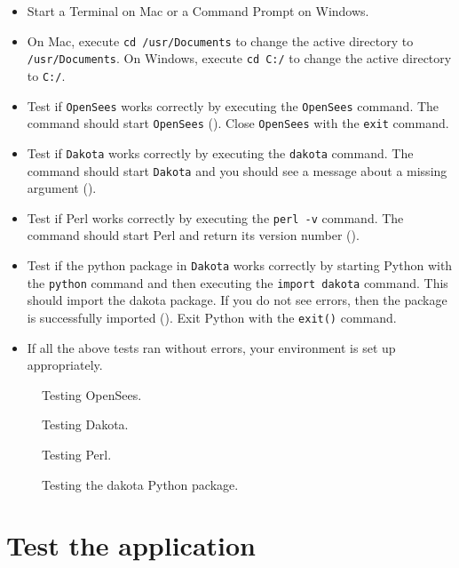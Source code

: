 \begin{itemize}
    \item Start a Terminal on Mac or a Command Prompt on Windows.
    \item On Mac, execute \texttt{cd /usr/Documents} to change the active directory to \texttt{/usr/Documents}. On Windows, execute \texttt{cd C:/} to change the active directory to \texttt{C:/}.
    \item Test if \texttt{OpenSees} works correctly by executing the \texttt{OpenSees} command. The command should start \texttt{OpenSees} (). Close \texttt{OpenSees} with the \texttt{exit} command.
    \item Test if \texttt{Dakota} works correctly by executing the \texttt{dakota} command. The command should start \texttt{Dakota} and you should see a message about a missing argument ().
    \item Test if Perl works correctly by executing the \texttt{perl -v} command. The command should start Perl and return its version number ().
    \item Test if the python package in \texttt{Dakota} works correctly by starting Python with the \texttt{python} command and then executing the \texttt{import dakota} command. This should import the dakota package. If you do not see errors, then the package is successfully imported (). Exit Python with the \texttt{exit()} command.
    \item If all the above tests ran without errors, your environment is set up appropriately.
\end{itemize}

\begin{figure}[!htbp]
  \caption{Testing OpenSees.}
  \label{fig:opensees_test}
\end{figure}

\begin{figure}[!htbp]
  \caption{Testing Dakota.}
  \label{fig:dakota_test}
\end{figure}

\begin{figure}[!htbp]
  \caption{Testing Perl.}
  \label{fig:perl_test}
\end{figure}

\begin{figure}[!htbp]
  \caption{Testing the dakota Python package.}
  \label{fig:dakota_py_test}
\end{figure}

\clearpage
\section{Test the \texttt{\getsoftwarename{}} application}
\label{sec:test_local}

